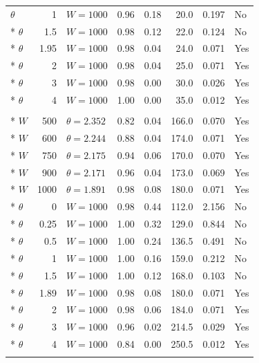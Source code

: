\documentclass[preprint,12pt]{elsarticle}
\begin{document}
\begin{longtable}{lrlrrrrl}
$\theta$ & 1 & $W=1000$ & 0.96 & 0.18 & 20.0 & 0.197 & No\\*
$\theta$ & 1.5 & $W=1000$ & 0.98 & 0.12 & 22.0 & 0.124 & No\\*
$\theta$ & 1.95 & $W=1000$ & 0.98 & 0.04 & 24.0 & 0.071 & Yes\\*
$\theta$ & 2 & $W=1000$ & 0.98 & 0.04 & 25.0 & 0.071 & Yes\\*
$\theta$ & 3 & $W=1000$ & 0.98 & 0.00 & 30.0 & 0.026 & Yes\\*
$\theta$ & 4 & $W=1000$ & 1.00 & 0.00 & 35.0 & 0.012 & Yes\\
\addlinespace
\multicolumn{8}{l}{\textit{Bimodal shift}}\\*
$W$ & 500 & $\theta=2.352$ & 0.82 & 0.04 & 166.0 & 0.070 & Yes\\*
$W$ & 600 & $\theta=2.244$ & 0.88 & 0.04 & 174.0 & 0.071 & Yes\\*
$W$ & 750 & $\theta=2.175$ & 0.94 & 0.06 & 170.0 & 0.070 & Yes\\*
$W$ & 900 & $\theta=2.171$ & 0.96 & 0.04 & 173.0 & 0.069 & Yes\\*
$W$ & 1000 & $\theta=1.891$ & 0.98 & 0.08 & 180.0 & 0.071 & Yes\\*
$\theta$ & 0 & $W=1000$ & 0.98 & 0.44 & 112.0 & 2.156 & No\\*
$\theta$ & 0.25 & $W=1000$ & 1.00 & 0.32 & 129.0 & 0.844 & No\\*
$\theta$ & 0.5 & $W=1000$ & 1.00 & 0.24 & 136.5 & 0.491 & No\\*
$\theta$ & 1 & $W=1000$ & 1.00 & 0.16 & 159.0 & 0.212 & No\\*
$\theta$ & 1.5 & $W=1000$ & 1.00 & 0.12 & 168.0 & 0.103 & No\\*
$\theta$ & 1.89 & $W=1000$ & 0.98 & 0.08 & 180.0 & 0.071 & Yes\\*
$\theta$ & 2 & $W=1000$ & 0.98 & 0.06 & 184.0 & 0.071 & Yes\\*
$\theta$ & 3 & $W=1000$ & 0.96 & 0.02 & 214.5 & 0.029 & Yes\\*
$\theta$ & 4 & $W=1000$ & 0.84 & 0.00 & 250.5 & 0.012 & Yes\\
\addlinespace
\end{longtable}\endgroup
\end{document}
